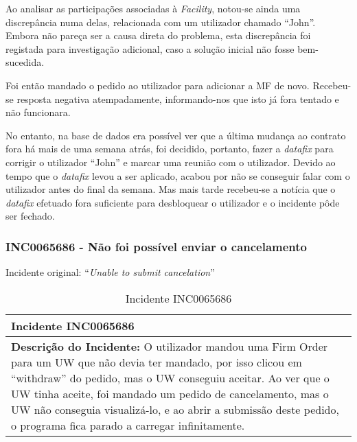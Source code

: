            Ao analisar as participações associadas à \textit{Facility}, notou-se ainda uma discrepância numa delas, relacionada com um utilizador chamado ``John''. Embora não pareça ser a causa direta do problema, esta discrepância foi registada para investigação adicional, caso a solução inicial não fosse bem-sucedida.

            Foi então mandado o pedido ao utilizador para adicionar a MF de novo. Recebeu-se resposta negativa atempadamente, informando-nos que isto já fora tentado e não funcionara.
            
            No entanto, na base de dados era possível ver que a última mudança ao contrato fora há mais de uma semana atrás, foi decidido, portanto, fazer a \textit{datafix} para corrigir o utilizador ``John'' e marcar uma reunião com o utilizador. Devido ao tempo que o \textit{datafix} levou a ser aplicado, acabou por não se conseguir falar com o utilizador antes do final da semana. Mas mais tarde recebeu-se a notícia que o \textit{datafix} efetuado fora suficiente para desbloquear o utilizador e o incidente pôde ser fechado.
            
        \subsubsection{INC0065686 - Não foi possível enviar o cancelamento}\label{secsec:inc0065686} %
                
            Incidente original: ``\textit{Unable to submit cancelation}''

            \begin{table}[H] %
                \centering
                \caption{Incidente INC0065686}\label{table:incINC0065686}
                \begin{tabularx}{1\textwidth}{|>{\raggedright\arraybackslash}X|}
                    \hline
                    \rowcolor{lightgray}
                    \textbf{Incidente INC0065686} \\
                    \hline
                    \rowcolor{lightgray!20}
                
                    \textbf{Descrição do Incidente:} O utilizador mandou uma Firm Order para um UW que não devia ter mandado, por isso clicou em ``withdraw'' do pedido, mas o UW conseguiu aceitar. Ao ver que o UW tinha aceite, foi mandado um pedido de cancelamento, mas o UW não conseguia visualizá-lo, e ao abrir a submissão deste pedido, o programa fica parado a carregar infinitamente.

                    \\
                    \hline
                \end{tabularx}
            \end{table}

